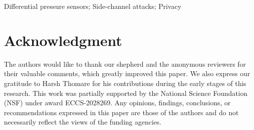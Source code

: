 \documentclass[conference,compsoc]{IEEEtran}
\begin{document}
\begin{IEEEkeywords}
Differential pressure sensors; Side-channel attacks; Privacy
\end{IEEEkeywords}







% 











% 


\section*{Acknowledgment}

The authors would like to thank our shepherd and the anonymous reviewers for their valuable comments, which greatly improved this paper. We also express our gratitude to Harsh Thomare for his contributions during the early stages of this research. 
This work was partially supported by the National Science Foundation (NSF) under award ECCS-2028269. Any opinions, findings, conclusions, or recommendations expressed in this paper are those of the authors and do not necessarily reflect the views of the funding agencies.





\end{document}
